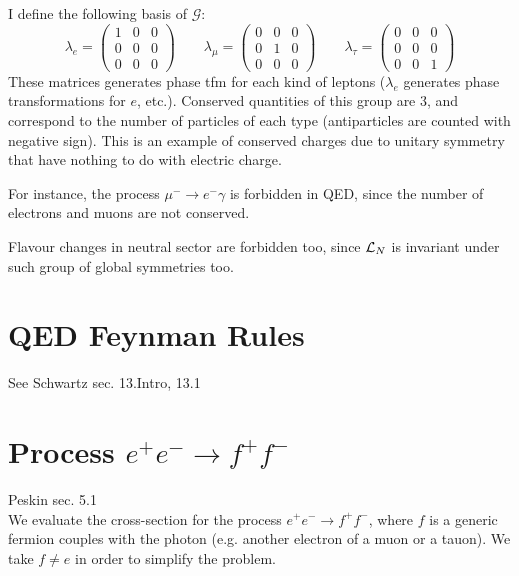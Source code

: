 \documentclass[TheoreticalPhy_ModB.tex]{subfiles}
\begin{document}
I define the following basis of $\mathcal{G}$:
\[
\lambda_e =
\begin{pmatrix}
1	& 0 	& 0 \\
0	& 0	& 0 \\
0	& 0	& 0
\end{pmatrix}
\qquad
\lambda_{\mu} =
\begin{pmatrix}
0	& 0 	& 0 \\
0	& 1	& 0 \\
0	& 0	& 0
\end{pmatrix}
\qquad
\lambda_{\tau} =
\begin{pmatrix}
0	& 0 	& 0 \\
0	& 0	& 0 \\
0	& 0	& 1
\end{pmatrix}
\]
These matrices generates phase tfm for each kind of leptons ($\lambda_e$ generates phase transformations for $e$, etc.).
Conserved quantities of this group are 3, and correspond to the number of particles of each type (antiparticles are counted with negative sign).
This is an example of conserved charges due to unitary symmetry that have nothing to do with electric charge.

For instance, the process $\mu^- \to e^- \gamma$ is forbidden in QED, since the number of electrons and muons are not conserved.
 
Flavour changes in neutral sector are forbidden too, since $\mathcal{L}_N$ is invariant under such group of global symmetries too.


\section{QED Feynman Rules}

\textsf{See Schwartz sec. 13.Intro, 13.1}

\section{Process $e^+ e^- \to f^+ f^-$}\label{sec:electr-to-muon-scatt-QED}

\textsf{Peskin sec. 5.1}\\

We evaluate the cross-section for the process $e^+ e^- \to f^+ f^-$, where $f$ is a generic fermion couples with the photon (e.g. another electron of a muon or a tauon). We take $f\neq e$ in order to simplify the problem.
\end{document}

